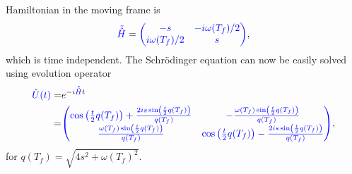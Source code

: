 Hamiltonian in the moving frame is
\begin{equation}
    \textcolor{blue}{\tilde{\hat{H}}}=\textcolor{blue}{\begin{pmatrix}
        -s&-i\omega(T_f)/2\\
        i\omega(T_f)/2&s
    \end{pmatrix}},
\end{equation}
which is time independent. The Schr\"odinger equation can now be easily solved using evolution operator
\begin{equation}
    \begin{split}
        \textcolor{blue}{\hat U(t)}=&e^{-i\textcolor{blue}{\tilde{\hat{H}}}t}\\
        =&\textcolor{blue}{\begin{pmatrix}
            \cos \left(\frac{t}{2} q(T_f)\right)+\frac{2 i s \sin \left(\frac{t}{2} q(T_f)\right)}{q(T_f)} & -\frac{\omega(T_f)  \sin \left(\frac{t}{2} q(T_f)\right)}{q(T_f)} \\
            \frac{\omega(T_f)  \sin \left(\frac{t}{2} q(T_f)\right)}{q(T_f)} & \cos \left(\frac{t}{2} q(T_f)\right)-\frac{2 i s \sin \left(\frac{t}{2} q(T_f)\right)}{q(T_f)} \\
        \end{pmatrix}},
    \end{split}
    \label{eq:evolutionBlue}
\end{equation}
for $q(T_f)=\sqrt{4 s^2+\omega(T_f) ^2}$.

